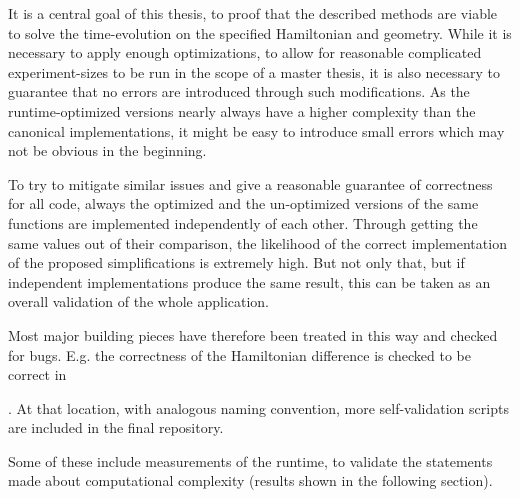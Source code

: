It is a central goal of this thesis, to proof that the described methods are viable to solve the time-evolution on the specified Hamiltonian and geometry.
While it is necessary to apply enough optimizations, to allow for reasonable complicated experiment-sizes to be run in the scope of a master thesis, it is also necessary to guarantee that no errors are introduced through such modifications.
As the runtime-optimized versions nearly always have a higher complexity than the canonical implementations, it might be easy to introduce small errors which may not be obvious in the beginning.

To try to mitigate similar issues and give a reasonable guarantee of correctness for all code, always the optimized and the un-optimized versions of the same functions are implemented independently of each other.
Through getting the same values out of their comparison, the likelihood of the correct implementation of the proposed simplifications is extremely high.
But not only that, but if independent implementations produce the same result, this can be taken as an overall validation of the whole application.

Most major building pieces have therefore been treated in this way and checked for bugs.
E.g. the correctness of the Hamiltonian difference is checked to be correct in 

.
At that location, with analogous naming convention, more self-validation scripts are included in the final repository.

Some of these include measurements of the runtime, to validate the statements made about computational complexity (results shown in the following section).
